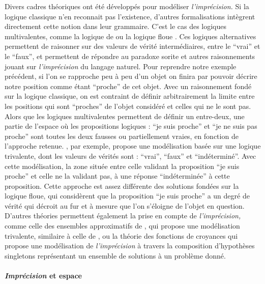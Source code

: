 Divers cadres théoriques ont été développés pour modéliser
\emph{l'imprécision.} Si la logique classique n'en reconnait pas
l'existence, d'autres formalisations intègrent directement cette
notion dans leur grammaire. C'est le cas des logiques multivalentes,
comme la logique de  ou la logique floue
\autocite{Williamson1994,Sorensen2018}. Ces logiques alternatives
permettent de raisonner sur des valeurs de vérité intermédiaires,
entre le \enquote{vrai} et le \enquote{faux}, et permettent de
répondre au paradoxe sorite et autres raisonnements jouant sur
\emph{l'imprécision} du langage naturel. Pour reprendre notre exemple
précédent, si l'on se rapproche peu à peu d'un objet on finira par
pouvoir décrire notre position comme étant \enquote{proche} de cet
objet. Avec un raisonnement fondé sur la logique classique, on est
contraint de définir arbitrairement la limite entre les positions qui
sont \enquote{proches} de l'objet considéré et celles qui ne le sont
pas. Alors que les logiques multivalentes permettent de définir un
entre-deux, une partie de l'espace où les propositions logiques :
\enquote{je suis proche} et \enquote{je ne suis pas proche} sont
toutes les deux fausses ou partiellement vraies, en fonction de
l'approche retenue. \textcite{Tye1994}, par exemple, propose une
modélisation basée sur une logique trivalente, dont les valeurs de
vérités sont : \enquote{vrai}, \enquote{faux} et
\enquote{indéterminé}. Avec cette modélisation, la zone située entre
celle validant la proposition \enquote{je suis proche} et celle ne la
validant pas, à une réponse \enquote{indéterminée} à cette
proposition. Cette approche est assez différente des solutions fondées
sur la logique floue, qui considèrent que la proposition \enquote{je
  suis proche} a un degré de vérité qui décroit au fur et à mesure que
l'on s'éloigne de l'objet en question. D'autres théories permettent
également la prise en compte de \emph{l'imprécision,} comme celle des
ensembles approximatifs de \textcite{Pawlak1982}, qui propose une
modélisation trivalente, similaire à celle de \textcite{Tye1994}
\autocite{Pawlak1991}, ou la théorie des fonctions de croyances
\autocite{Shafer1976} qui propose une modélisation de
\emph{l'imprécision} à travers la composition d'hypothèses singletons
représentant un ensemble de solutions à un problème donné.

\paragraph{\emph{Imprécision} et espace}

